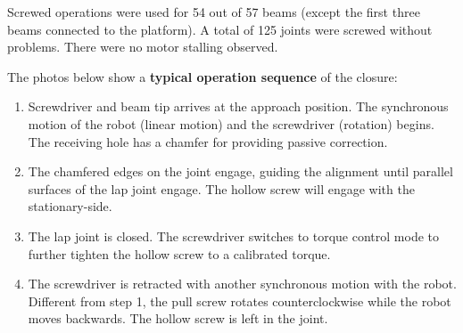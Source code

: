 \documentclass[11pt]{book}
\begin{document}
Screwed operations were used for 54 out of 57 beams (except the first three beams connected to the platform). A total of 125 joints were screwed without problems. There were no motor stalling observed.

The photos below show a \textbf{typical operation sequence} of the closure:

\begin{enumerate}
	\item Screwdriver and beam tip arrives at the approach position. The synchronous motion of the robot (linear motion) and the screwdriver (rotation) begins. The receiving hole has a chamfer for providing passive correction.

	\item The chamfered edges on the joint engage, guiding the alignment until parallel surfaces of the lap joint engage. The hollow screw will engage with the stationary-side.

	\item The lap joint is closed. The screwdriver switches to torque control mode to further tighten the hollow screw to a calibrated torque.

	\item The screwdriver is retracted with another synchronous motion with the robot. Different from step 1, the pull screw rotates counterclockwise while the robot moves backwards. The hollow screw is left in the joint.

\end{enumerate}
\end{document}
